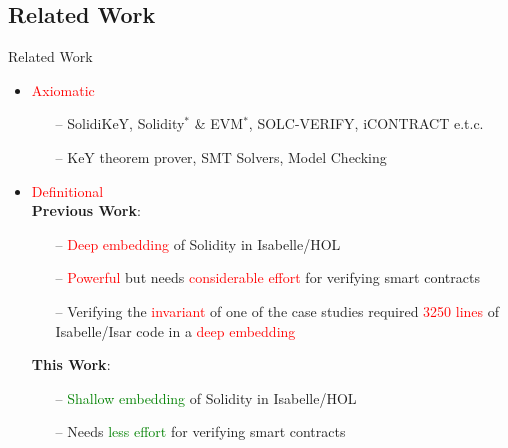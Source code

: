 \documentclass[aspectratio=169]{beamer}
\newcommand{\tikzmark}[2][]{%
  \tikz[remember picture,overlay,baseline=-.5ex] \node[#1] (#2) {};%
}
\begin{document}
\subsection{Related Work}
\begin{frame}{Related Work}
%
\begin{itemize}
%
\item{\textcolor{red}{Axiomatic}}
\begin{itemize}
\item[--] SolidiKeY, Solidity$^*$ \& EVM$^*$, SOLC-VERIFY, iCONTRACT e.t.c. 
\item[--]  KeY theorem prover, SMT Solvers, Model Checking
\end{itemize}
%

%
\item{\textcolor{red}{Definitional}}\\
\vspace{0.15in}
\textbf{Previous Work}:\\
\begin{itemize}
\item[--] \textcolor{red}{Deep embedding} of Solidity in Isabelle/HOL
\item[--] \textcolor{red}{Powerful} but needs \textcolor{red}{considerable effort} for verifying smart contracts  
\item[--] Verifying the \textcolor{red}{invariant} of one of the case studies required \textcolor{red}{3250 lines} of Isabelle/Isar code in a \textcolor{red}{deep embedding}
\end{itemize}
%
\vspace{0.15in}
\textbf{This Work}:\\
\begin{itemize}
\item[--] \textcolor{green}{Shallow embedding} of Solidity in Isabelle/HOL
\item[--] Needs \textcolor{green}{less effort} for verifying smart contracts  
\end{itemize}
\end{itemize}
\end{frame}
\end{document}
